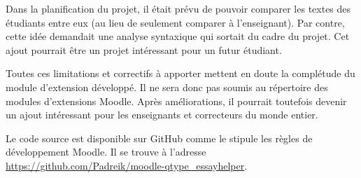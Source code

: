 Dans la planification du projet, il était prévu de pouvoir comparer les textes des étudiants entre eux (au lieu de seulement comparer à l'enseignant).
Par contre, cette idée demandait une analyse syntaxique qui sortait du cadre du projet.
Cet ajout pourrait être un projet intéressant pour un futur étudiant.

Toutes ces limitations et correctifs à apporter mettent en doute la complétude du module d'extension développé.
Il ne sera donc pas soumis au répertoire des modules d'extensions Moodle.
Après améliorations, il pourrait toutefois devenir un ajout intéressant pour les enseignants et correcteurs du monde entier.

Le code source est disponible sur GitHub comme le stipule les règles de développement Moodle.
Il se trouve à l'adresse \url{https://github.com/Padreik/moodle-qtype_essayhelper}.